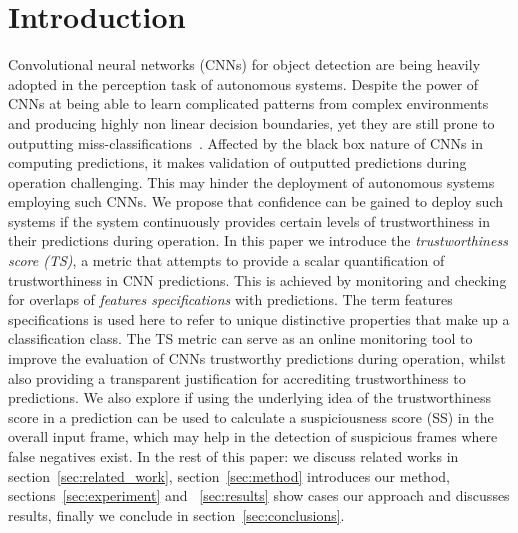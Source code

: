 
\section{Introduction}
Convolutional neural networks (CNNs) for object detection are being  heavily adopted in the perception task of autonomous systems.
%
Despite the power of CNNs at being able to learn complicated patterns from complex environments and producing highly non linear decision boundaries, yet they are still prone to outputting miss-classifications~\cite{Ghobrial2022}. 
%
Affected by the black box nature of CNNs in computing predictions, it makes validation of outputted predictions during operation challenging.
%
This may hinder the deployment of autonomous systems employing such CNNs.
%
We propose that confidence can be gained to deploy such systems if the system continuously provides certain levels of trustworthiness in their predictions during operation.
%
In this paper we introduce the \textit{trustworthiness score (TS)}, a metric that attempts to provide a scalar quantification of trustworthiness in CNN predictions. 
%
This is achieved by monitoring and checking for overlaps of \textit{features specifications} with predictions. 
%
The term features specifications is used here to refer to unique distinctive properties that make up a classification class.
%  
%
The TS metric can serve as an online monitoring tool to improve the evaluation of CNNs trustworthy predictions during operation, whilst also providing a transparent justification for accrediting trustworthiness to predictions. 
%
We also explore if using the underlying idea of the trustworthiness score in a prediction can be used to calculate a suspiciousness score (SS) in the overall input frame, which may help in the detection of suspicious frames where false negatives exist.
%
%
In the rest of this paper: we discuss related works in section~\ref{sec:related_work}, section~\ref{sec:method} introduces our method,
%
sections~\ref{sec:experiment} and ~\ref{sec:results} show cases our approach and discusses results, finally we conclude in section~\ref{sec:conclusions}.


